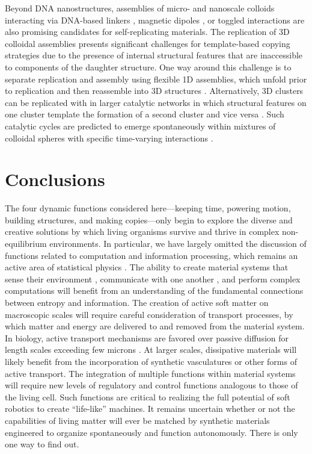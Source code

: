 \begin{appendices}
Beyond DNA nanostructures, assemblies of micro- and nanoscale colloids interacting via DNA-based linkers \autocite{leunissen2009towards}, magnetic dipoles \autocite{zhang2014self, dempster2015self}, or toggled interactions \autocite{zhang2014accelerated,sherman2016dynamic} are also promising candidates for self-replicating materials. The replication of 3D colloidal assemblies presents significant challenges for template-based copying strategies due to the presence of internal structural features that are inaccessible to components of the daughter structure.  One way around this challenge is to separate replication and assembly using flexible 1D assemblies, which unfold prior to replication and then reassemble into 3D structures \autocite{cademartiri2014programmable}.  Alternatively, 3D clusters can be replicated with in larger catalytic networks in which structural features on one cluster template the formation of a second cluster and vice versa \autocite{Zeravcic2014}.  Such catalytic cycles are predicted to emerge spontaneously within mixtures of colloidal spheres with specific time-varying interactions \autocite{Zeravcic2017}.

\section{Conclusions}

The four dynamic functions considered here---keeping time, powering motion, building structures, and making copies---only begin to explore the diverse and creative solutions by which living organisms survive and thrive in complex non-equilibrium environments. In particular, we have largely omitted the discussion of functions related to computation and information processing, which remains an active area of statistical physics \autocite{Parrondo2015, Lutz2015}. The ability to create material systems that sense their environment \autocite{della2018fuel}, communicate with one another \autocite{chen2013programmable}, and perform complex computations \autocite{fang2016pattern} will benefit from an understanding of the fundamental connections between entropy and information. The creation of active soft matter on macroscopic scales will require careful consideration of transport processes, by which matter and energy are delivered to and removed from the material system. In biology, active transport mechanisms are favored over passive diffusion for length scales exceeding few microns \autocite{soh2010reaction}. At larger scales, dissipative materials will likely benefit from the incorporation of synthetic vasculatures or other forms of active transport. The integration of multiple functions within material systems will require new levels of regulatory and control functions \autocite{he2012synthetic} analogous to those of the living cell. Such functions are critical to realizing the full potential of soft robotics \autocite{whitesides2018soft} to create ``life-like'' machines. It remains uncertain whether or not the capabilities of living matter will ever be matched by synthetic materials engineered to organize spontaneously and function autonomously. There is only one way to find out.
\end{appendices}